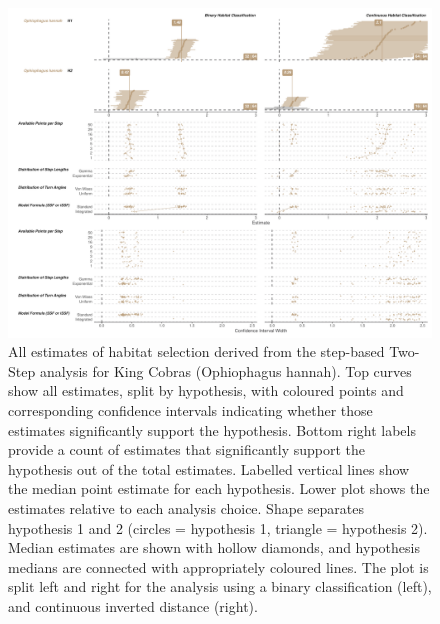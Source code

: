 \documentclass[10pt,a4paper]{article}
\begin{document}
\begin{figure}
\includegraphics[width=1\linewidth]{../../figures/specCurve_Ophiophagus hannah_twoStep} \caption{All estimates of habitat selection derived from the step-based Two-Step analysis for King Cobras (Ophiophagus hannah). Top curves show all estimates, split by hypothesis, with coloured points and corresponding confidence intervals indicating whether those estimates significantly support the hypothesis. Bottom right labels provide a count of estimates that significantly support the hypothesis out of the total estimates. Labelled vertical lines show the median point estimate for each hypothesis. Lower plot shows the estimates relative to each analysis choice. Shape separates hypothesis 1 and 2 (circles = hypothesis 1, triangle = hypothesis 2). Median estimates are shown with hollow diamonds, and hypothesis medians are connected with appropriately coloured lines. The plot is split left and right for the analysis using a binary classification (left), and continuous inverted distance (right).}\label{fig:specCurveTwoStepOPHA}
\end{figure}
\end{document}
